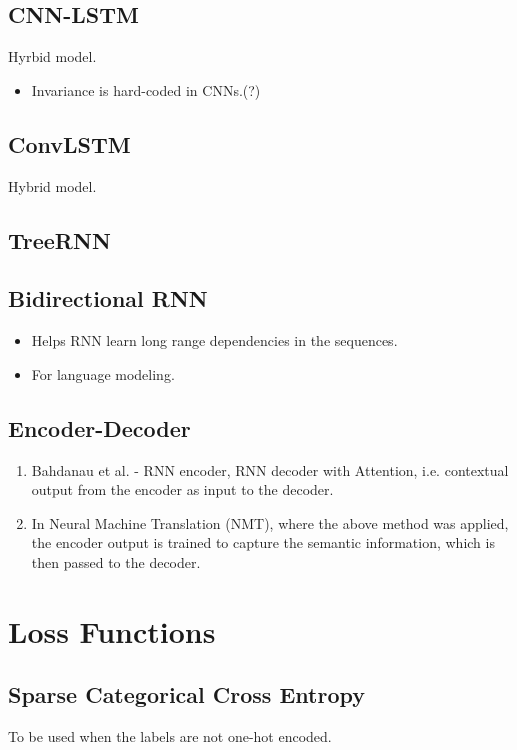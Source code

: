 \documentclass[a4paper, 12pt]{report}
\begin{document}
\section{CNN-LSTM}
\label{sec:cnn-lstm}
Hyrbid model.

\begin{itemize}
\item {\color{red}Invariance is hard-coded in CNNs.(?)}

\end{itemize}

\section{ConvLSTM}
Hybrid model.
\section{TreeRNN}

\section{Bidirectional RNN}
\begin{itemize}
\item Helps RNN learn long range dependencies in the sequences.
\item For language modeling.
\end{itemize}

\section{Encoder-Decoder}
\label{sec:enc-dec}
\begin{enumerate}
\item Bahdanau et al. - RNN encoder, RNN decoder with Attention, i.e. contextual output from the encoder as input to the decoder.
\item In Neural Machine Translation (NMT), where the above method was applied, the encoder output is trained to capture the semantic information, which is then passed to the decoder.
\end{enumerate}

\chapter{Loss Functions}

\section{Sparse Categorical Cross Entropy}
To be used when the labels are not one-hot encoded.
\end{document}
